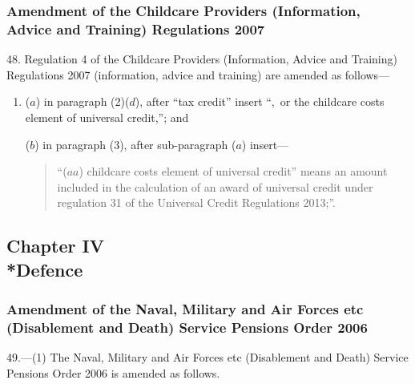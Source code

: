 \documentclass[12pt,a4paper]{article}
\begin{document}
\subsubsection[48. Amendment of the Childcare Providers (Information, Advice and Training) Regulations 2007]{Amendment of the Childcare Providers (Information, Advice and Training) Regulations 2007}

48.  Regulation 4 of the Childcare Providers (Information, Advice and Training) Regulations 2007 (information, advice and training) are amended as follows—
\begin{enumerate}\item[]
($a$) in paragraph (2)($d$), after “tax credit” insert “,~or the childcare costs element of universal credit,”; and

($b$) in paragraph (3), after sub-paragraph ($a$)  insert—
\begin{quotation}
“($aa$) childcare costs element of universal credit” means an amount included in the calculation of an award of universal credit under regulation 31 of the Universal Credit Regulations 2013;”.
\end{quotation}
\end{enumerate}

\subsection[Chapter IV --- Defence]{Chapter IV\\*Defence}

\renewcommand\parthead{--- Part III Chapter IV}

\subsubsection[49. Amendment of the Naval, Military and Air Forces etc (Disablement and Death) Service Pensions Order 2006]{Amendment of the Naval, Military and Air Forces etc (Disablement and Death) Service Pensions Order 2006}

49.—(1) The Naval, Military and Air Forces etc (Disablement and Death) Service Pensions Order 2006 is amended as follows.
\end{document}

